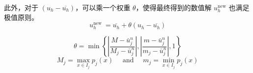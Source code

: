\documentclass{article}
\numberwithin{equation}{subsection}    %
\begin{document}
此外，对于 $(u_h-\overline{u_h})$，可以乘一个权重 $\theta$，使得最终得到的数值解 $u_h^{\text{new}}$ 也满足极值原则。
\begin{equation}
    u_{h}^{\text {new }}=\overline{u_h}+\theta(u_h-\overline{u_h})
\end{equation}

\begin{equation}
    \theta=\min \left\{\left|\frac{M-\bar{u}_{j}^{n}}{M_{j}-\bar{u}_{j}^{n}}\right|,\left|\frac{m-\bar{u}_{j}^{n}}{m_{j}-\bar{u}_{j}^{n}}\right|, 1\right\}
\end{equation}
\begin{equation}
    M_{j}=\max _{x \in I_{j}} p_{j}(x) \quad \text { and } \quad m_{j}=\min _{x \in I_{j}} p_{j}(x)
\end{equation}

\newpage
\end{document}
